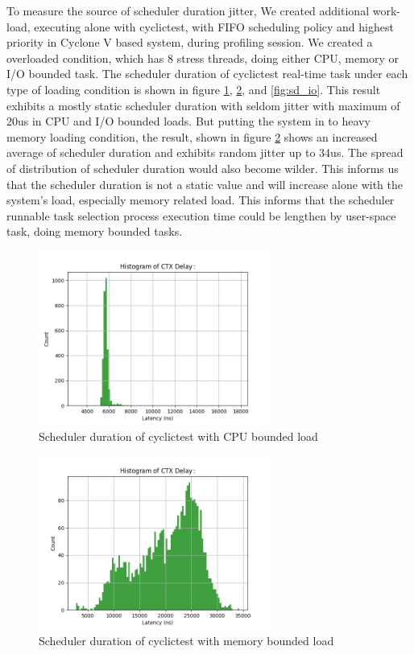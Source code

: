 \documentclass[conference]{IEEEtran}
\begin{document}
    To measure the source of scheduler duration jitter, We created additional work-load, executing alone with
    cyclictest, with FIFO scheduling policy and highest priority in Cyclone V based system, during profiling session. We
    created a overloaded condition, which has 8 stress threads, doing either CPU, memory or I/O bounded task. The
    scheduler duration of cyclictest real-time task under each type of loading condition is shown in figure
    \ref{fig:sd_cpu}, \ref{fig:sd_memory}, and \ref{fig:sd_io}. This result exhibits a mostly static scheduler
    duration with seldom jitter with maximum of 20us in CPU and I/O bounded loads. But putting the system in to heavy
    memory loading condition, the result, shown in figure \ref{fig:sd_memory} shows an increased average of scheduler
    duration and exhibits random jitter up to 34us. The spread of distribution of scheduler duration would also become
    wilder. This informs us that the scheduler duration is not a static value and will increase alone with the system's
    load, especially memory related load. This informs that the scheduler runnable task selection process execution time
    could be lengthen by user-space task, doing memory bounded tasks.

    \begin{figure} \centering \includegraphics[width=3in]{img/sd-cpu.png} \caption{Scheduler duration of cyclictest
    with CPU bounded load} \label{fig:sd_cpu} \end{figure}

    \begin{figure} \centering \includegraphics[width=3in]{img/sd-memory.png} \caption{Scheduler duration of cyclictest
    with memory bounded load} \label{fig:sd_memory} \end{figure}
\end{document}
